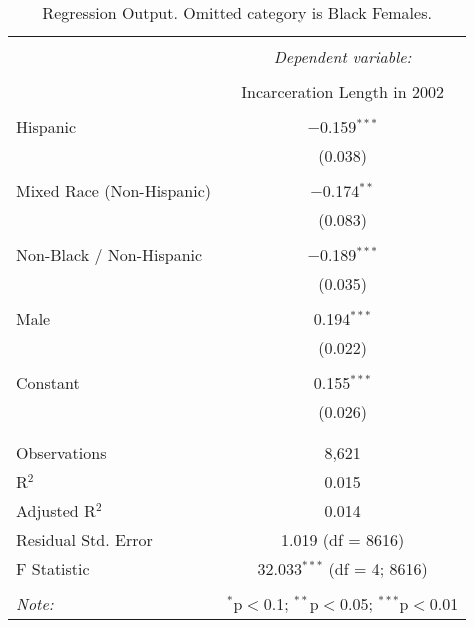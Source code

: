 
\begin{table}[!htbp] \centering 
  \caption{Regression Output. Omitted category is Black Females.} 
  \label{tab:regression} 
\begin{tabular}{@{\extracolsep{5pt}}lc} 
\\[-1.8ex]\hline 
\hline \\[-1.8ex] 
 & \multicolumn{1}{c}{\textit{Dependent variable:}} \\ 
\cline{2-2} 
\\[-1.8ex] & Incarceration Length in 2002 \\ 
\hline \\[-1.8ex] 
 Hispanic & $-$0.159$^{***}$ \\ 
  & (0.038) \\ 
  & \\ 
 Mixed Race (Non-Hispanic) & $-$0.174$^{**}$ \\ 
  & (0.083) \\ 
  & \\ 
 Non-Black / Non-Hispanic & $-$0.189$^{***}$ \\ 
  & (0.035) \\ 
  & \\ 
 Male & 0.194$^{***}$ \\ 
  & (0.022) \\ 
  & \\ 
 Constant & 0.155$^{***}$ \\ 
  & (0.026) \\ 
  & \\ 
\hline \\[-1.8ex] 
Observations & 8,621 \\ 
R$^{2}$ & 0.015 \\ 
Adjusted R$^{2}$ & 0.014 \\ 
Residual Std. Error & 1.019 (df = 8616) \\ 
F Statistic & 32.033$^{***}$ (df = 4; 8616) \\ 
\hline 
\hline \\[-1.8ex] 
\textit{Note:}  & \multicolumn{1}{r}{$^{*}$p$<$0.1; $^{**}$p$<$0.05; $^{***}$p$<$0.01} \\ 
\end{tabular} 
\end{table} 
